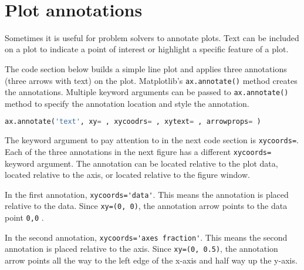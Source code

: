 \documentclass{book}
\newcommand{\passthrough}[1]{#1}
\begin{document}
    \begin{center}
    \end{center}
    { \hspace*{\fill} \\}
    

    
        \hypertarget{plot-annotations}{%
\section{Plot annotations}\label{plot-annotations}}
    




    
        Sometimes it is useful for problem solvers to annotate plots. Text can
be included on a plot to indicate a point of interest or highlight a
specific feature of a plot.
    




    
        The code section below builds a simple line plot and applies three
annotations (three arrows with text) on the plot. Matplotlib's
\passthrough{\lstinline!ax.annotate()!} method creates the annotations.
Multiple keyword arguments can be passed to
\passthrough{\lstinline!ax.annotate()!} method to specify the annotation
location and style the annotation.

\begin{lstlisting}[language=Python]
ax.annotate('text', xy= , xycoodrs= , xytext= , arrowprops= )
\end{lstlisting}

The keyword argument to pay attention to in the next code section is
\passthrough{\lstinline!xycoords=!}. Each of the three annotations in
the next figure has a different \passthrough{\lstinline!xycoords=!}
keyword argument. The annotation can be located relative to the plot
data, located relative to the axis, or located relative to the figure
window.

In the first annotation, \passthrough{\lstinline!xycoords='data'!}. This
means the annotation is placed relative to the data. Since
\passthrough{\lstinline!xy=(0, 0)!}, the annotation arrow points to the
data point \passthrough{\lstinline!0,0!} .

In the second annotation,
\passthrough{\lstinline!xycoords='axes fraction'!}. This means the
second annotation is placed relative to the axis. Since
\passthrough{\lstinline!xy=(0, 0.5)!}, the annotation arrow points all
the way to the left edge of the x-axis and half way up the y-axis.
\end{document}

